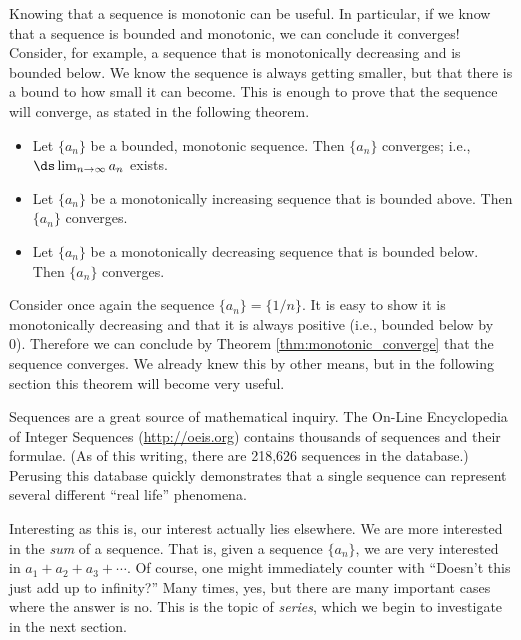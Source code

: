 Knowing that a sequence is monotonic can be useful. In particular, if we know that a sequence is bounded and monotonic, we can conclude it converges! Consider, for example, a sequence that is monotonically decreasing and is bounded below. We know the sequence is always getting smaller, but that there is a bound to how small it can become. This is enough to prove that the sequence will converge, as stated in the following theorem.

{\begin{itemize}
\item		Let $\{a_n\}$ be a bounded, monotonic sequence. Then $\{a_n\}$ converges; i.e., $\ds \lim_{n \to\infty}a_n$ exists.
\item		Let $\{a_n\}$ be a monotonically increasing sequence that is bounded above. Then $\{a_n\}$ converges.
\item		Let $\{a_n\}$ be a monotonically decreasing sequence that is bounded below. Then $\{a_n\}$ converges.
\end{itemize}
}

Consider once again the sequence $\{a_n\} = \{1/n\}$. It is easy to show it is monotonically decreasing and that it is always positive (i.e., bounded below by 0). Therefore we can conclude by Theorem \ref{thm:monotonic_converge} that the sequence converges. We already knew this by other means, but in the following section this theorem will become very useful.

Sequences are a great source of mathematical inquiry. The On-Line Encyclopedia of Integer Sequences (\url{http://oeis.org}) contains thousands of sequences and their formulae. (As of this writing, there are 218,626 sequences in the database.) Perusing this database quickly demonstrates that a single sequence can represent several different ``real life'' phenomena. 

Interesting as this is, our interest actually lies elsewhere. We are more interested in the \emph{sum} of a sequence. That is, given a sequence $\{a_n\}$, we are very interested in $a_1+a_2+a_3+\cdots$. Of course, one might immediately counter with ``Doesn't this just add up to infinity?'' Many times, yes, but there are many important cases where the answer is no. This is the topic of \emph{series}, which we begin to investigate in the next section.

